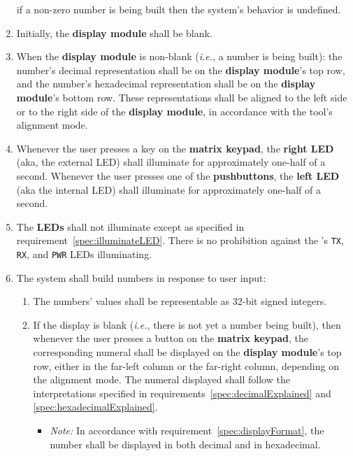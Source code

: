\begin{enumerate}
        if a non-zero number is being built then the system's behavior is undefined.
    \item Initially, the \textbf{display module} shall be blank.
    \item \label{spec:displayFormat} When the \textbf{display module} is non-blank (\textit{i.e.}, a number is being built):
        the number's decimal representation shall be on the \textbf{display module}'s top row,
        and the number's hexadecimal representation shall be on the \textbf{display module}'s bottom row.
        These representations shall be aligned to the left side or to the right side of the \textbf{display module}, in accordance with the tool's alignment mode.
    \item \label{spec:illuminateLED} Whenever the user presses a key on the \textbf{matrix keypad}, the \textbf{right LED} (aka, the external LED) shall illuminate for approximately one-half of a second.
        Whenever the user presses one of the \textbf{pushbuttons}, the \textbf{left LED} (aka the internal LED) shall illuminate for approximately one-half of a second.
    \item \label{spec:LEDoffWhenOtherwise} The \textbf{LEDs} shall not illuminate except as specified in requirement~\ref{spec:illuminateLED}.
        There is no prohibition against the \developmentboard's \texttt{TX}, \texttt{RX}, and \texttt{PWR} LEDs illuminating.
    \item The system shall build numbers in response to user input:
        \begin{enumerate}
        \item \label{spec:32bits} The numbers' values shall be representable as 32-bit signed integers.
        \item \label{spec:initialKeyPress} If the display is blank (\textit{i.e.}, there is not yet a number being built), then whenever the user presses a button on the \textbf{matrix keypad}, the corresponding numeral shall be displayed on the \textbf{display module}'s top row, either in the far-left column or the far-right column, depending on the alignment mode.
            The numeral displayed shall follow the interpretations specified in requirements~\ref{spec:decimalExplained} and \ref{spec:hexadecimalExplained}.
            \begin{itemize}
                \item \textit{Note:} In accordance with requirement~\ref{spec:displayFormat}, the number shall be displayed in both decimal and in hexadecimal.

\end{itemize}
\end{enumerate}
\end{enumerate}
